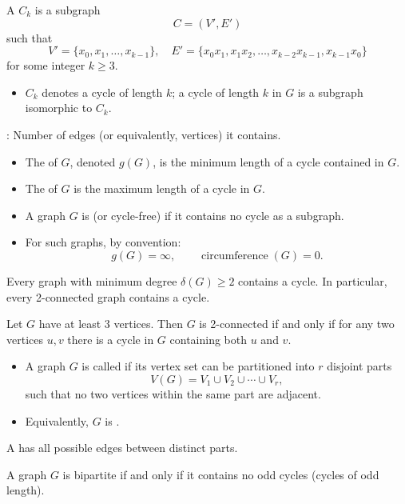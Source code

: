 \documentclass[8pt,a4paper,landscape]{extarticle}
\begin{document}
\begin{cscolumns}
\begin{definition}[Cycle]
A  $C_k$ is a subgraph
\[ C=(V',E') \]
such that
\[ V'=\{x_0,x_1,\dots,x_{k-1}\},\quad E'=\{x_0x_1,x_1x_2,\dots,x_{k-2}x_{k-1},x_{k-1}x_0\} \]
for some integer $k\ge 3$.
\begin{itemize}
\item $C_k$ denotes a cycle of length $k$; a cycle of length $k$ in $G$ is a subgraph isomorphic to $C_k$.
\end{itemize}
\end{definition}
\begin{definition}
: Number of edges (or equivalently, vertices) it contains.
\begin{itemize}
\item The  of $G$, denoted $g(G)$, is the minimum length of a cycle contained in $G$.
\item The  of $G$ is the maximum length of a cycle in $G$.
\end{itemize}
\end{definition}
\begin{definition}
\begin{itemize}
\item A graph $G$ is  (or cycle-free) if it contains no cycle as a subgraph.
\item For such graphs, by convention:
\[ g(G)=\infty,\qquad \operatorname{circumference}(G)=0. \]
\end{itemize}
\end{definition}
\begin{theorem}[Proposition]
Every graph with minimum degree $\delta(G)\ge 2$ contains a cycle. In particular, every 2-connected graph contains a cycle.
\end{theorem}
\begin{theorem}[Whitney, 1932]
Let $G$ have at least 3 vertices. Then $G$ is 2-connected if and only if for any two vertices $u,v$ there is a cycle in $G$ containing both $u$ and $v$.
\end{theorem}
\columnbreak
{}
\begin{definition}[$r$-Partite]
\begin{itemize}
\item A graph $G$ is called  if its vertex set can be partitioned into $r$ disjoint parts
\[ V(G)=V_1\cup V_2\cup\cdots\cup V_r, \]
such that no two vertices within the same part are adjacent.
\item Equivalently, $G$ is .
\end{itemize}
\end{definition}
\begin{definition}
A  has all possible edges between distinct parts.
\end{definition}
\begin{theorem}[Proposition]
A graph $G$ is bipartite if and only if it contains no odd cycles (cycles of odd length).
\end{theorem}



\end{cscolumns}
\end{document}
